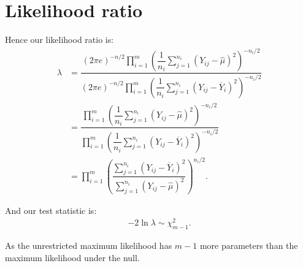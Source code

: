 \documentclass[12pt,a4paper]{article}
\newcommand{\ovY}{\overline{Y}}
\newcommand{\wmu}{\widehat{\mu}}
\begin{document}
	\section{Likelihood ratio}
	Hence our likelihood ratio is:
	\begin{align*}
		\lambda &= \dfrac{(2\pi e)^{-n/2}\prod_{i=1}^m \left(\dfrac{1}{n_i} \sum_{j=1}^{n_i} (Y_{ij}-\wmu)^2\right)^{-n_i/2}}{(2\pi e)^{-n/2}\prod_{i=1}^m \left(\dfrac{1}{n_i} \sum_{j=1}^{n_i} (Y_{ij}-\ovY_i)^2\right)^{-n_i/2}} \\
		&= \dfrac{\prod_{i=1}^m \left(\dfrac{1}{n_i} \sum_{j=1}^{n_i} (Y_{ij}-\wmu)^2\right)^{-n_i/2}}{\prod_{i=1}^m \left(\dfrac{1}{n_i} \sum_{j=1}^{n_i} (Y_{ij}-\ovY_i)^2\right)^{-n_i/2}} \\
		&= \prod_{i=1}^m \left(\dfrac{\sum_{j=1}^{n_i} (Y_{ij}-\ovY_i)^2}{\sum_{j=1}^{n_i} (Y_{ij}-\wmu)^2}\right)^{n_i/2}.
	\end{align*}

	And our test statistic is:
	\begin{align*}
		-2\ln{\lambda} \sim \chi^2_{m-1}.
	\end{align*}

	As the unrestricted maximum likelihood has $m-1$ more parameters than the maximum likelihood under the null.
\end{document}
